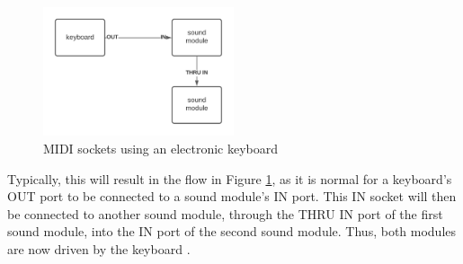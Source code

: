 \begin{figure}
	\centering
	\includegraphics[width=0.5\textwidth]{figures/midi-sockets.png}
	\caption{MIDI sockets using an electronic keyboard}
	\label{fig:midi-sockets}
\end{figure}

Typically, this will result in the flow in Figure \ref{fig:midi-sockets}, as it is normal for a keyboard's OUT port to be connected to a sound module's IN port. This IN socket will then be connected to another sound module, through the THRU IN port of the first sound module, into the IN port of the second sound module. Thus, both modules are now driven by the keyboard \cite{Kirk_Hunt_2013}.

